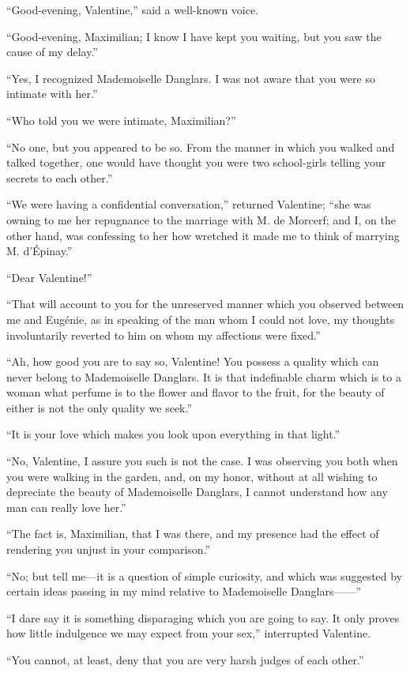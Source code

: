 “Good-evening, Valentine,” said a well-known voice.

“Good-evening, Maximilian; I know I have kept you waiting, but you saw
the cause of my delay.”

“Yes, I recognized Mademoiselle Danglars. I was not aware that you were
so intimate with her.”

“Who told you we were intimate, Maximilian?”

“No one, but you appeared to be so. From the manner in which you walked
and talked together, one would have thought you were two school-girls
telling your secrets to each other.”

“We were having a confidential conversation,” returned Valentine; “she
was owning to me her repugnance to the marriage with M. de Morcerf; and
I, on the other hand, was confessing to her how wretched it made me to
think of marrying M. d’Épinay.”

“Dear Valentine!”

“That will account to you for the unreserved manner which you observed
between me and Eugénie, as in speaking of the man whom I could not
love, my thoughts involuntarily reverted to him on whom my affections
were fixed.”

“Ah, how good you are to say so, Valentine! You possess a quality which
can never belong to Mademoiselle Danglars. It is that indefinable charm
which is to a woman what perfume is to the flower and flavor to the
fruit, for the beauty of either is not the only quality we seek.”

“It is your love which makes you look upon everything in that light.”

“No, Valentine, I assure you such is not the case. I was observing you
both when you were walking in the garden, and, on my honor, without at
all wishing to depreciate the beauty of Mademoiselle Danglars, I cannot
understand how any man can really love her.”

“The fact is, Maximilian, that I was there, and my presence had the
effect of rendering you unjust in your comparison.”

“No; but tell me—it is a question of simple curiosity, and which was
suggested by certain ideas passing in my mind relative to Mademoiselle
Danglars——”

“I dare say it is something disparaging which you are going to say. It
only proves how little indulgence we may expect from your sex,”
interrupted Valentine.

“You cannot, at least, deny that you are very harsh judges of each
other.”

